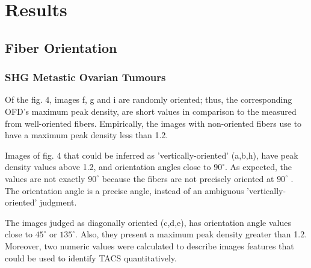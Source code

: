 \documentclass[12pt,a4paper]{article}
\begin{document}
\section{Results}
\subsection{Fiber Orientation}
\subsubsection{SHG Metastic Ovarian Tumours}

Of the fig. 4, images f, g and i are randomly oriented; thus, the corresponding OFD's maximum peak density, are short values in comparison to the measured from well-oriented fibers. Empirically, the images with non-oriented fibers use to have a maximum peak density less than 1.2. 

Images of fig. 4 that could be inferred as 'vertically-oriented' (a,b,h), have peak density values above 1.2, and orientation angles close to $90^{\circ}$. As expected, the values are not exactly  $90^{\circ}$  because the fibers are not precisely oriented at  $90^{\circ}$ . The orientation angle is a precise angle, instead of an ambiguous 'vertically-oriented' judgment.  

The images judged as diagonally oriented (c,d,e), has orientation angle values close to  $45^{\circ}$ or  $135^{\circ}$. Also, they present a maximum peak density greater than 1.2. Moreover, two numeric values were calculated to describe images features that could be used to identify TACS quantitatively.
\end{document}
